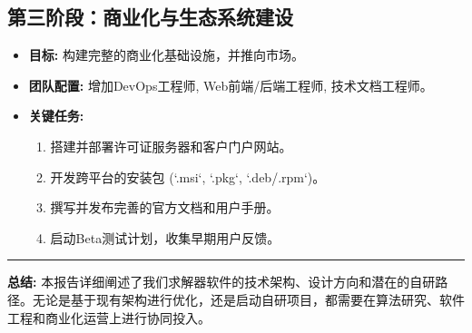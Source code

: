 \documentclass[a4paper, 12pt]{article}
\begin{document}
\subsection{第三阶段：商业化与生态系统建设}
\begin{itemize}
    \item \textbf{目标:} 构建完整的商业化基础设施，并推向市场。
    \item \textbf{团队配置:} 增加DevOps工程师, Web前端/后端工程师, 技术文档工程师。
    \item \textbf{关键任务:}
        \begin{enumerate}
            \item 搭建并部署许可证服务器和客户门户网站。
            \item 开发跨平台的安装包 (`.msi`, `.pkg`, `.deb/.rpm`)。
            \item 撰写并发布完善的官方文档和用户手册。
            \item 启动Beta测试计划，收集早期用户反馈。
        \end{enumerate}
\end{itemize}

\vspace{1cm}
\hrule
\vspace{1cm}
\begin{center}
    \textbf{总结:} 本报告详细阐述了我们求解器软件的技术架构、设计方向和潜在的自研路径。无论是基于现有架构进行优化，还是启动自研项目，都需要在算法研究、软件工程和商业化运营上进行协同投入。
\end{center}
\end{document}

